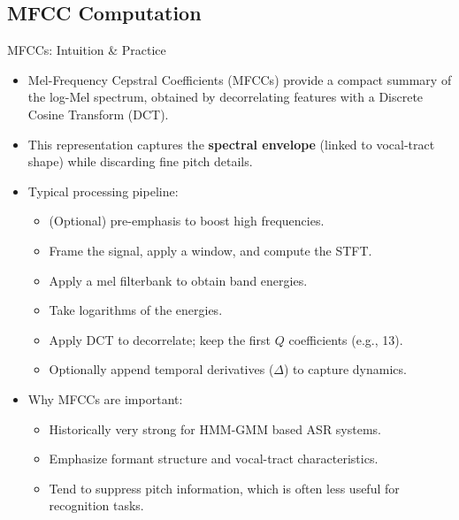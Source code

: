 \subsection{MFCC Computation}

\begin{frame}[allowframebreaks]{MFCCs: Intuition \& Practice}

\begin{itemize}
    \item Mel-Frequency Cepstral Coefficients (MFCCs) provide a compact summary of the log-Mel spectrum, obtained by decorrelating features with a Discrete Cosine Transform (DCT).  
    \item This representation captures the \textbf{spectral envelope} (linked to vocal-tract shape) while discarding fine pitch details.  
    
    \item Typical processing pipeline:
    \begin{itemize}
        \item (Optional) pre-emphasis to boost high frequencies.
        \item Frame the signal, apply a window, and compute the STFT.
        \item Apply a mel filterbank to obtain band energies.
        \item Take logarithms of the energies.
        \item Apply DCT to decorrelate; keep the first $Q$ coefficients (e.g., 13).
        \item Optionally append temporal derivatives ($\Delta$) to capture dynamics.
    \end{itemize}
\framebreak
    \item Why MFCCs are important:
    \begin{itemize}
        \item Historically very strong for HMM-GMM based ASR systems.
        \item Emphasize formant structure and vocal-tract characteristics.
        \item Tend to suppress pitch information, which is often less useful for recognition tasks.
    \end{itemize}
\end{itemize}

\end{frame}


